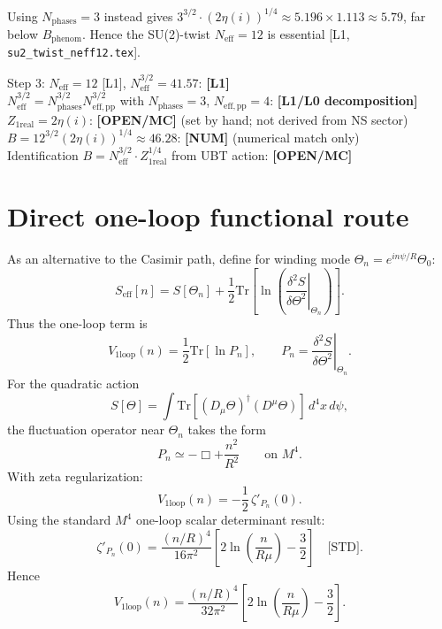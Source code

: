\documentclass[12pt,a4paper]{article}
\begin{document}
Using $N_{\mathrm{phases}} = 3$ instead gives
$3^{3/2}\cdot(2\eta(i))^{1/4} \approx 5.196\times 1.113 \approx 5.79$,
far below $B_{\mathrm{phenom}}$.  Hence the SU(2)-twist $N_{\mathrm{eff}} = 12$
is essential [L1, \texttt{su2\_twist\_neff12.tex}].

\begin{statusbox}
Step 3: $N_{\mathrm{eff}} = 12$ [L1], $N_{\mathrm{eff}}^{3/2} = 41.57$: \textbf{[L1]}\\
$N_{\mathrm{eff}}^{3/2}=N_{\mathrm{phases}}^{3/2}N_{\mathrm{eff,pp}}^{3/2}$ with $N_{\mathrm{phases}}=3$, $N_{\mathrm{eff,pp}}=4$: \textbf{[L1/L0 decomposition]}\\
$Z_{1\mathrm{real}} = 2\eta(i)$: \textbf{[OPEN/MC]} (set by hand; not derived from NS sector)\\
$B = 12^{3/2}(2\eta(i))^{1/4} \approx 46.28$: \textbf{[NUM]} (numerical match only)\\
Identification $B=N_{\mathrm{eff}}^{3/2}\cdot Z_{1\mathrm{real}}^{1/4}$ from UBT action: \textbf{[OPEN/MC]}
\end{statusbox}

\section{Direct one-loop functional route}
\label{sec:direct_1loop}

As an alternative to the Casimir path, define for winding mode
$\Theta_n=e^{in\psi/R}\Theta_0$:
\[
S_{\mathrm{eff}}[n]
= S[\Theta_n]
+ \frac12 \mathrm{Tr}\!\left[\ln\!\left(
\left.\frac{\delta^2S}{\delta\Theta^2}\right|_{\Theta_n}
\right)\right].
\]
Thus the one-loop term is
\[
V_{1\mathrm{loop}}(n)=\frac12\mathrm{Tr}[\ln P_n],\qquad
P_n=\left.\frac{\delta^2S}{\delta\Theta^2}\right|_{\Theta_n}.
\]
For the quadratic action
\[
S[\Theta]=\int \mathrm{Tr}\!\left[(D_\mu\Theta)^\dagger(D^\mu\Theta)\right]\,d^4x\,d\psi,
\]
the fluctuation operator near $\Theta_n$ takes the form
\[
P_n\simeq -\Box + \frac{n^2}{R^2}
\qquad\text{on }M^4.
\]
With zeta regularization:
\[
V_{1\mathrm{loop}}(n)= -\frac12\,\zeta'_{P_n}(0).
\]
Using the standard $M^4$ one-loop scalar determinant result:
\[
\zeta'_{P_n}(0)
=\frac{(n/R)^4}{16\pi^2}
\left[2\ln\!\left(\frac{n}{R\mu}\right)-\frac32\right]
\quad\text{[STD]}.
\]
Hence
\[
V_{1\mathrm{loop}}(n)
=\frac{(n/R)^4}{32\pi^2}
\left[2\ln\!\left(\frac{n}{R\mu}\right)-\frac32\right].
\]
\end{document}
